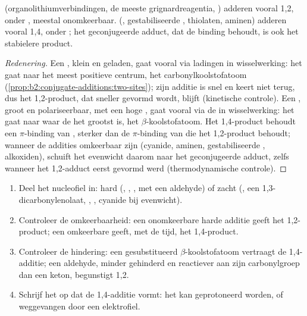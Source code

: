 \begin{proposition}\label{prop:b2:conjugate-additions:regio}
 (organolithiumverbindingen, de meeste grignardreagentia, ) adderen vooral 1,2, onder ,
meestal onomkeerbaar.  (, gestabiliseerde , thiolaten,
aminen) adderen vooral 1,4, onder ; het geconjugeerde adduct, dat de binding  behoudt, is
ook het stabielere product.
\end{proposition}

\begin{proof}[Redenering]
Een , klein en geladen, gaat vooral via ladingen in wisselwerking: het gaat naar het meest positieve
centrum, het carbonylkoolstofatoom (\cref{prop:b2:conjugate-additions:two-sites}); zijn additie is snel en
keert niet terug, dus het 1,2-product, dat sneller gevormd wordt, blijft (kinetische controle). Een ,
groot en polariseerbaar, met een hoge , gaat vooral via de  in wisselwerking: het gaat naar waar
de  het grootst is, het $\beta$-koolstofatoom. Het 1,4-product behoudt een $\pi$-binding van , sterker dan de
$\pi$-binding van  die het 1,2-product behoudt; wanneer de addities omkeerbaar zijn (cyanide, aminen,
gestabiliseerde , alkoxiden), schuift het evenwicht daarom naar het geconjugeerde adduct, zelfs wanneer het
1,2-adduct eerst gevormd werd (thermodynamische controle).
\end{proof}

\begin{method}\label{met:b2:conjugate-additions:predict-mode}
\begin{enumerate}
  \item Deel het nucleofiel in: hard (, , ,  met een aldehyde)
        of zacht (, een 1,3-dicarbonylenolaat, , , cyanide bij evenwicht).
  \item Controleer de omkeerbaarheid: een onomkeerbare harde additie geeft het 1,2-product; een omkeerbare
        geeft, met de tijd, het 1,4-product.
  \item Controleer de hindering: een gesubstitueerd $\beta$-koolstofatoom vertraagt de 1,4-additie; een aldehyde, minder gehinderd
        en reactiever aan zijn carbonylgroep dan een keton, begunstigt 1,2.
  \item Schrijf het  op dat de 1,4-additie vormt: het kan geprotoneerd worden, of weggevangen door een
        elektrofiel.
\end{enumerate}
\end{method}

